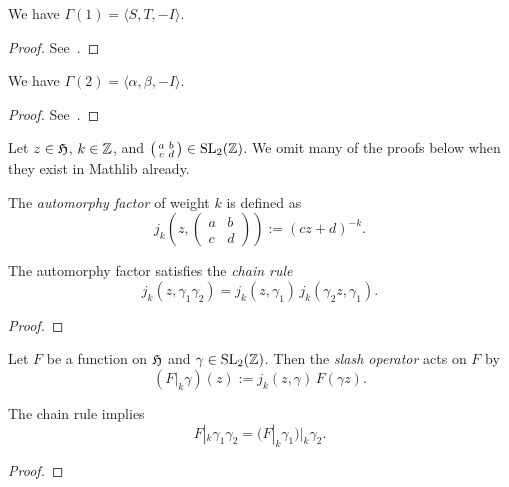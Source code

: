\begin{lemma}\label{lemma:Gamma-1-generators}\leanok
  We have $\Gamma(1) = \langle S, T, -I \rangle$.
\end{lemma}
\begin{proof}
    \leanok
  See~\cite[Exercise 1.1.1]{first course}.
\end{proof}

\begin{lemma}\label{lemma:Gamma-2-generators}\leanok
  We have $\Gamma(2) = \langle \alpha, \beta, -I \rangle$.
\end{lemma}
\begin{proof}
    \leanok
    See~\cite[Exercise 1.2.4]{first course}.
\end{proof}

Let $z\in\mathfrak{H}$, $k\in\mathbb{Z}$, and $\left(\begin{smallmatrix}a&b\\c&d\end{smallmatrix}\right)\in\mathrm{SL}_2(\mathbb{Z})$. We omit many of the proofs below when they exist in Mathlib already.
\begin{definition}\label{def:automorphy-factor}\leanok {}
    The \emph{automorphy factor} of weight $k$ is defined as
$$j_k(z,\left(\begin{smallmatrix}a&b\\c&d\end{smallmatrix}\right)):=(cz+d)^{-k}.$$
\end{definition}

\begin{lemma}\label{lemma:automorphy-factor-chain-rule}\leanok {}
    The automorphy factor satisfies the \emph{chain rule}
$$j_k(z,\gamma_1\gamma_2)=j_k(z,\gamma_1)\,j_k(\gamma_2z,\gamma_1). $$
\end{lemma}
\begin{proof}
    \leanok
\end{proof}

\begin{definition}\label{def:slash-operator}\leanok
    Let $F$ be a function on $\mathfrak{H}$ and $\gamma\in\mathrm{SL}_2(\mathbb{Z})$. Then the \emph{slash operator} acts on $F$ by
$$(F|_k\gamma)(z):=j_k(z,\gamma)\,F(\gamma z). $$
\end{definition}

\begin{lemma}\label{lemma:slash-operator-chain-rule}\leanok
  The chain rule implies $$F|_k\gamma_1\gamma_2=(F|_k\gamma_1)|_k\gamma_2.$$
\end{lemma}
\begin{proof}
    \leanok
\end{proof}

